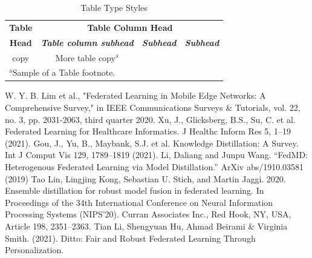 \documentclass[conference]{IEEEtran}
\begin{document}
\begin{table}[htbp]
\caption{Table Type Styles}
\begin{center}
\begin{tabular}{|c|c|c|c|}
\hline
\textbf{Table}&\multicolumn{3}{|c|}{\textbf{Table Column Head}} \\
\cline{2-4} 
\textbf{Head} & \textbf{\textit{Table column subhead}}& \textbf{\textit{Subhead}}& \textbf{\textit{Subhead}} \\
\hline
copy& More table copy$^{\mathrm{a}}$& &  \\
\hline
\multicolumn{4}{l}{$^{\mathrm{a}}$Sample of a Table footnote.}
\end{tabular}
\label{tab1}
\end{center}
\end{table}

\begin{thebibliography}{00}
 W. Y. B. Lim et al., "Federated Learning in Mobile Edge Networks: A Comprehensive Survey," in IEEE Communications Surveys \& Tutorials, vol. 22, no. 3, pp. 2031-2063, third quarter 2020.
 Xu, J., Glicksberg, B.S., Su, C. et al. Federated Learning for Healthcare Informatics. J Healthc Inform Res 5, 1–19 (2021).
 Gou, J., Yu, B., Maybank, S.J. et al. Knowledge Distillation: A Survey. Int J Comput Vis 129, 1789–1819 (2021).
 Li, Daliang and Junpu Wang. “FedMD: Heterogenous Federated Learning via Model Distillation.” ArXiv abs/1910.03581 (2019)
 Tao Lin, Lingjing Kong, Sebastian U. Stich, and Martin Jaggi. 2020. Ensemble distillation for robust model fusion in federated learning. In Proceedings of the 34th International Conference on Neural Information Processing Systems (NIPS'20). Curran Associates Inc., Red Hook, NY, USA, Article 198, 2351–2363.
 Tian Li, Shengyuan Hu, Ahmad Beirami \& Virginia Smith. (2021). Ditto: Fair and Robust Federated Learning Through Personalization. 
\end{thebibliography}
\end{document}
